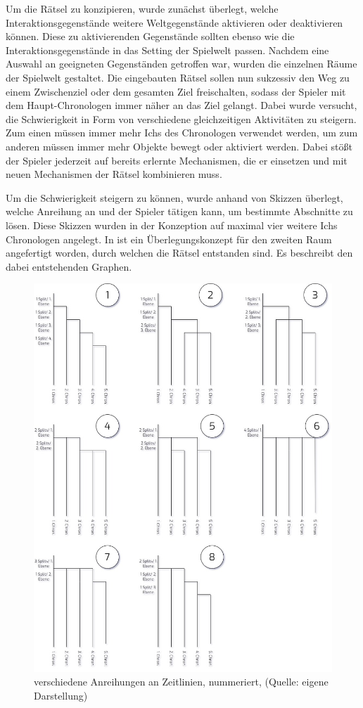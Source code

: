Um die Rätsel zu konzipieren, wurde zunächst überlegt, welche Interaktionsgegenstände weitere Weltgegenstände aktivieren oder deaktivieren können. Diese zu aktivierenden Gegenstände sollten ebenso wie die Interaktionsgegenstände in das Setting der Spielwelt passen. Nachdem eine Auswahl an geeigneten Gegenständen getroffen war, wurden die einzelnen Räume der Spielwelt gestaltet. Die eingebauten Rätsel sollen nun sukzessiv den Weg zu einem Zwischenziel oder dem gesamten Ziel freischalten, sodass der Spieler mit dem Haupt-Chronologen immer näher an das Ziel gelangt. Dabei wurde versucht, die Schwierigkeit in Form von verschiedene gleichzeitigen Aktivitäten zu steigern. Zum einen müssen immer mehr Ichs des Chronologen verwendet werden, um zum anderen müssen immer mehr Objekte bewegt oder aktiviert werden. Dabei stößt der Spieler jederzeit auf bereits erlernte Mechanismen, die er einsetzen und mit neuen Mechanismen der Rätsel kombinieren muss. 

Um die Schwierigkeit steigern zu können, wurde anhand von Skizzen überlegt, welche Anreihung an  und  der Spieler tätigen kann, um bestimmte Abschnitte zu lösen. Diese Skizzen wurden in der Konzeption auf maximal vier weitere Ichs Chronologen angelegt. In  ist ein Überlegungskonzept für den zweiten Raum angefertigt worden, durch welchen die Rätsel entstanden sind. Es beschreibt den dabei entstehenden Graphen.

\begin{figure}[ht]
\centering
\includegraphics[width=0.8\linewidth]{content/pictures/Zeitlinienanreihung.jpg}
\caption{verschiedene Anreihungen an Zeitlinien, nummeriert, (Quelle: eigene Darstellung)}
\label{fig:zeitlinienanreihung}
\end{figure}
\newpage
